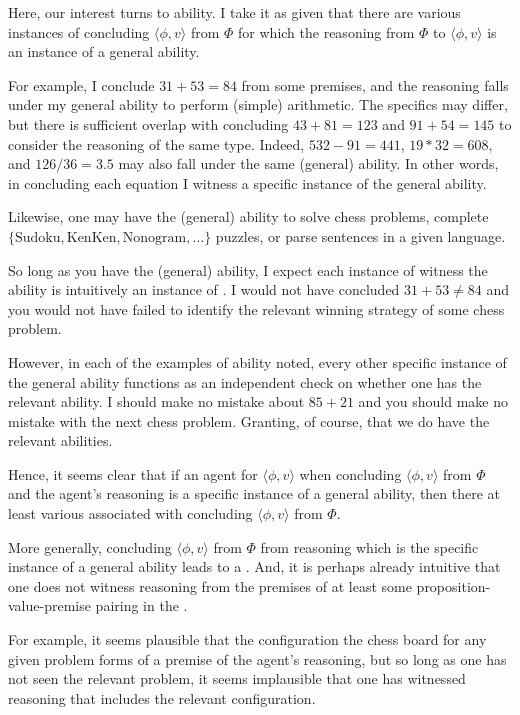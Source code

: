 \begin{note}[Ability]
  Here, our interest turns to ability.
  I take it as given that there are various instances of concluding \(\langle \phi,v \rangle\) from \(\Phi\) for which the reasoning from \(\Phi\) to \(\langle \phi,v \rangle\) is an instance of a general ability.

  For example, I conclude \(31 + 53 = 84\) from some premises, and the reasoning falls under my general ability to perform (simple) arithmetic.
  The specifics may differ, but there is sufficient overlap with concluding \(43 + 81 = 123\) and \(91 + 54 = 145\) to consider the reasoning of the same type.
  Indeed, \(532 - 91 = 441\), \(19 * 32 = 608\), and \(126/36 = 3.5\) may also fall under the same (general) ability.
  In other words, in concluding each equation I witness a specific instance of the general ability.

  Likewise, one may have the (general) ability to solve chess problems, complete \(\{ \text{Sudoku}, \text{KenKen}, \text{Nonogram}, \dots\}\) puzzles, or parse sentences in a given language.

  So long as you have the (general) ability, I expect each instance of witness the ability is intuitively an instance of \csN{}.
  I would not have concluded \(31 + 53 \ne 84\) and you would not have failed to identify the relevant winning strategy of some chess problem.

  However, in each of the examples of ability noted, every other specific instance of the general ability functions as an independent check on whether one has the relevant ability.
  I should make no mistake about \(85 + 21\) and you should make no mistake with the next chess problem.
  Granting, of course, that we do have the relevant abilities.

  Hence, it seems clear that if an agent \csV{} for \(\langle \phi,v \rangle\) when concluding \(\langle \phi,v \rangle\) from \(\Phi\) and the agent's reasoning is a specific instance of a general ability, then there at least various  associated with concluding \(\langle \phi,v \rangle\) from \(\Phi\).

  More generally, concluding \(\langle \phi,v \rangle\) from \(\Phi\) from reasoning which is the specific instance of a general ability leads to a \cluster{}.
  And, it is perhaps already intuitive that one does not witness reasoning from the premises of at least some proposition-value-premise pairing in the \cluster{}.

  For example, it seems plausible that the configuration the chess board for any given problem forms of a premise of the agent's reasoning, but so long as one has not seen the relevant problem, it seems implausible that one has witnessed reasoning that includes the relevant configuration.


\end{note}
